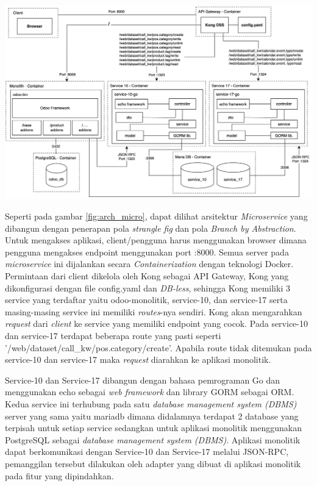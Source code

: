 \begin{center}
	\includegraphics[width=14cm]{img/bab_4/architectural_diag.png}
	\label{fig:arch_micro}
\end{center}

Seperti pada gambar \ref{fig:arch_micro}, dapat dilihat arsitektur \textit{Microservice} yang dibangun dengan penerapan pola \textit{strangle fig} dan pola \textit{Branch by Abstraction}. Untuk mengakses aplikasi, client/pengguna harus menggunakan browser dimana pengguna mengakses endpoint menggunakan port :8000. Semua server pada \textit{microservice} ini dijalankan secara \textit{Containerization} dengan teknologi Docker.  Permintaan dari client dikelola oleh Kong sebagai API Gateway, Kong yang dikonfigurasi dengan file config.yaml dan \textit{DB-less}, sehingga  Kong memiliki 3 service yang terdaftar yaitu odoo-monolitik, service-10, dan service-17 serta masing-masing service ini memiliki \textit{routes}-nya sendiri. Kong akan mengarahkan \textit{request} dari \textit{client} ke service yang memiliki endpoint yang cocok. Pada service-10 dan service-17 terdapat beberapa route yang pasti seperti '/web/dataset/call\_kw/pos.category/create'. Apabila route tidak ditemukan pada service-10 dan service-17 maka \textit{request} diarahkan ke aplikasi monolitik. 

Service-10 dan Service-17 dibangun dengan bahasa pemrograman Go dan menggunakan echo sebagai \textit{web framework} dan library GORM sebagai ORM. Kedua service ini terhubung pada satu \textit{database management system (DBMS)} server yang sama yaitu mariadb dimana didalamnya terdapat 2 database yang terpisah untuk setiap service sedangkan untuk aplikasi monolitik menggunakan PostgreSQL sebagai \textit{database management system (DBMS)}. Aplikasi monolitik dapat berkomunikasi dengan Service-10 dan Service-17 melalui JSON-RPC, pemanggilan tersebut dilakukan oleh adapter yang dibuat di aplikasi monolitik pada fitur yang dipindahkan.

